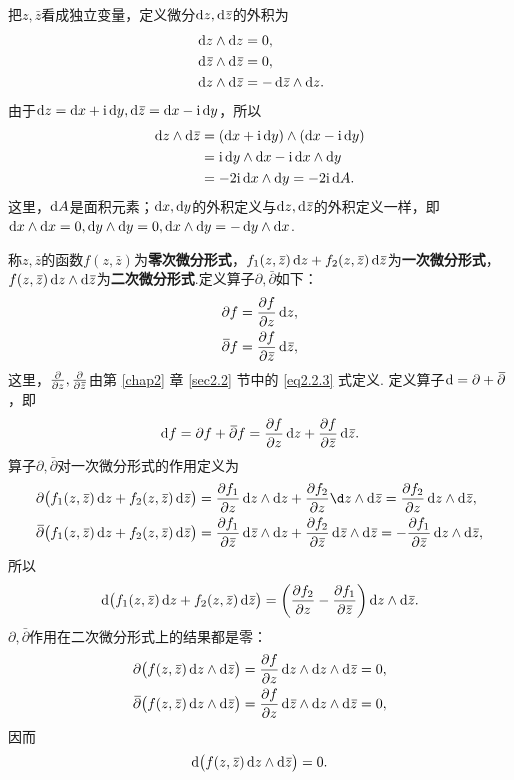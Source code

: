 把$z,\bar z$看成独立变量，定义微分$\dz,\dzz$的外积为
\begin{align*}
  & \dz\wedge \dz = 0,\\
  & \dzz\wedge \dzz = 0,\\
  & \dz\wedge \dzz = -\dzz\wedge \dz.
\end{align*}
由于$\dz=\dx+\ii\dy,\dzz=\dx-\ii\dy$，所以
\begin{align*}
  \dz\wedge\dzz & = (\dx+\ii\dy)\wedge(\dx-\ii\dy)\\
  & = \ii\dy\wedge\dx-\ii\dx\wedge\dy\\
  & = -2\ii\dx\wedge\dy = -2\ii\dif A.
\end{align*}
这里，$\dif A$是面积元素；$\dx,\dy$的外积定义与$\dz,\dzz$的外积定义一样，即$\dx\wedge\dx=0,\dy\wedge\dy=0,\dx\wedge\dy=-\dy\wedge\dx$.

称$z,\bar z$的函数$f(z,\bar z)$为\textbf{零次微分形式}，$f_1(z,\bar z)\dz+f_2(z,\bar z)\dzz$为\textbf{一次微分形式}，$f(z,\bar z)\dz\wedge\dzz$为\textbf{二次微分形式}.定义算子$\partial,\bar\partial$如下：
\begin{align*}
  & \partial f = \pp fz\dz,\\
  & \bar \partial f = \pp f{\bar z}\dzz,
\end{align*}
这里，$\pp{}z,\pp{}{\bar z}$由第 \ref{chap2} 章 \ref{sec2.2} 节中的 \eqref{eq2.2.3} 式定义. 定义算子$\dif =\partial+\bar\partial$，即
\begin{equation}\label{eq3.6.1}
  \dif f = \partial f + \bar\partial f = \pp fz\dz + \pp f{\bar z}\dzz.
\end{equation}
算子$\partial,\bar\partial$对一次微分形式的作用定义为
\begin{align*}
  \partial\big(f_1(z,\bar z)\dz+f_2(z,\bar z)\dzz\big)
  & = \pp{f_1}z\dz \wedge \dz + \pp{f_2}z \d z\wedge\dzz = \pp{f_2}z\dz \wedge \dzz,\\
  \bar\partial\big(f_1(z,\bar z)\dz+f_2(z,\bar z)\dzz\big)
  & = \pp{f_1}{\bar z}\dzz\wedge\dz+\pp{f_2}{\bar z}\dzz\wedge\dzz=-\pp{f_1}{\bar z}\dz\wedge\dzz,
\end{align*}
所以
\begin{equation}\label{eq3.6.2}
  \dif \big(f_1(z,\bar z)\dz + f_2(z,\bar z)\dzz\big)
  = \bigg(\pp{f_2}z-\pp{f_1}{\bar z}\bigg)\dz\wedge\dzz.
\end{equation}
$\partial,\bar\partial$作用在二次微分形式上的结果都是零：
\begin{align*}
  & \partial\big(f(z,\bar z)\dz\wedge\dzz\big) = \pp fz\dz\wedge\dz\wedge\dzz = 0,\\
  & \bar\partial\big(f(z,\bar z)\dz\wedge\dzz\big) = \pp fz\dzz\wedge\dz\wedge\dzz = 0,
\end{align*}
因而
\begin{equation}\label{eq3.6.3}
  \dif \big(f(z,\bar z)\dz\wedge\dzz\big)=0.
\end{equation}

